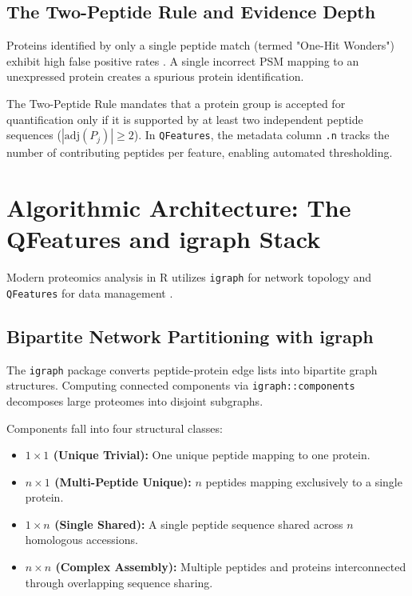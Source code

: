 \documentclass[11pt,twoside,openright]{book}
\begin{document}
\subsection{The Two-Peptide Rule and Evidence Depth}
Proteins identified by only a single peptide match (termed "One-Hit Wonders") exhibit high false positive rates \cite{gupta2009false, elias2007target, savitski2015measuring}. A single incorrect PSM mapping to an unexpressed protein creates a spurious protein identification.

The Two-Peptide Rule mandates that a protein group is accepted for quantification only if it is supported by at least two independent peptide sequences ($|\text{adj}(P_j)| \ge 2$). In \texttt{QFeatures}, the metadata column \texttt{.n} tracks the number of contributing peptides per feature, enabling automated thresholding.

\section{Algorithmic Architecture: The QFeatures and igraph Stack}

Modern proteomics analysis in R utilizes \texttt{igraph} for network topology and \texttt{QFeatures} for data management \cite{csardi2006igraph, gatto2023qfeatures, vanderaa2021reproducible, huber2015orchestrating}.

\subsection{Bipartite Network Partitioning with igraph}
The \texttt{igraph} package \cite{csardi2006igraph} converts peptide-protein edge lists into bipartite graph structures. Computing connected components via \texttt{igraph::components} decomposes large proteomes into disjoint subgraphs.

Components fall into four structural classes:
\begin{itemize}
    \item \textbf{$1 \times 1$ (Unique Trivial):} One unique peptide mapping to one protein.
    \item \textbf{$n \times 1$ (Multi-Peptide Unique):} $n$ peptides mapping exclusively to a single protein.
    \item \textbf{$1 \times n$ (Single Shared):} A single peptide sequence shared across $n$ homologous accessions.
    \item \textbf{$n \times n$ (Complex Assembly):} Multiple peptides and proteins interconnected through overlapping sequence sharing.
\end{itemize}
\end{document}
